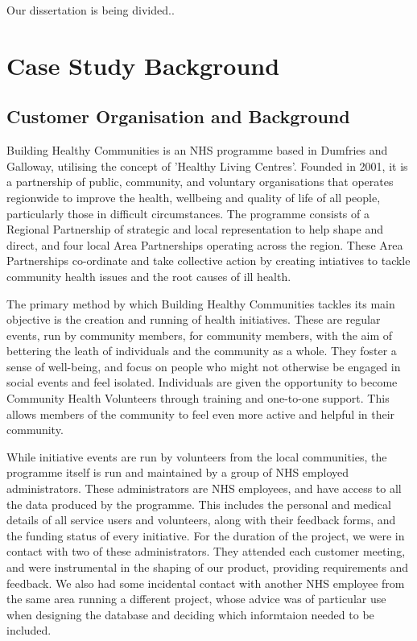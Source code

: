 \documentclass{l3proj}
\begin{document}

Our dissertation is being divided..

\section{Case Study Background}

\subsection{Customer Organisation and Background}
\label{customer}

Building Healthy Communities is an NHS programme based in Dumfries and Galloway, utilising the concept of 'Healthy Living Centres'. Founded in 2001, it is a partnership of public, community, and voluntary organisations that operates regionwide to improve the health, wellbeing and quality of life of all people, particularly those in difficult circumstances. The programme consists of a Regional Partnership of strategic and local representation to help shape and direct, and four local Area Partnerships operating across the region. These Area Partnerships co-ordinate and take collective action by creating intiatives to tackle community health issues and the root causes of ill health.

The primary method by which Building Healthy Communities tackles its main objective is the creation and running of health initiatives. These are regular events, run by community members, for community members, with the aim of bettering the leath of individuals and the community as a whole. They foster a sense of well-being, and focus on people who might not otherwise be engaged in social events and feel isolated. Individuals are given the opportunity to become Community Health Volunteers through training and one-to-one support. This allows members of the community to feel even more active and helpful in their community.

While initiative events are run by volunteers from the local communities, the programme itself is run and maintained by a group of NHS employed administrators. These administrators are NHS employees, and have access to all the data produced by the programme. This includes the personal and medical details of all service users and volunteers, along with their feedback forms, and the funding status of every initiative. For the duration of the project, we were in contact with two of these administrators. They attended each customer meeting, and were instrumental in the shaping of our product, providing requirements and feedback. We also had some incidental contact with another NHS employee from the same area running a different project, whose advice was of particular use when designing the database and deciding which informtaion needed to be included.
\end{document}
